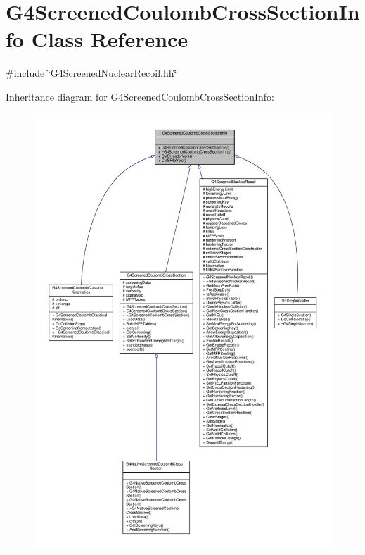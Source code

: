 \hypertarget{classG4ScreenedCoulombCrossSectionInfo}{}\section{G4\+Screened\+Coulomb\+Cross\+Section\+Info Class Reference}
\label{classG4ScreenedCoulombCrossSectionInfo}


{\ttfamily \#include \char`\"{}G4\+Screened\+Nuclear\+Recoil.\+hh\char`\"{}}



Inheritance diagram for G4\+Screened\+Coulomb\+Cross\+Section\+Info\+:
\nopagebreak
\begin{figure}[H]
\begin{center}
\leavevmode
\includegraphics[width=350pt]{classG4ScreenedCoulombCrossSectionInfo__inherit__graph}
\end{center}
\end{figure}


